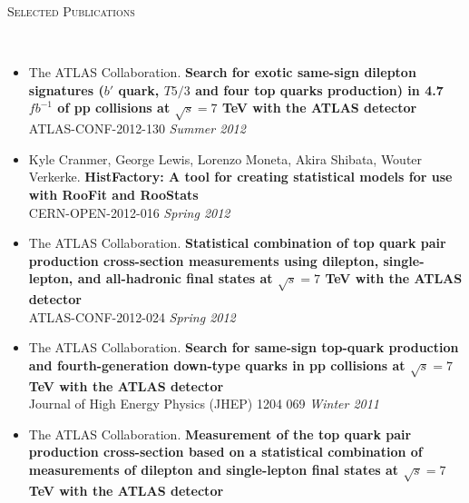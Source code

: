 \documentclass[9pt]{article}
\newenvironment{changemargin}[2]{%
  \begin{list}{}{%
    \setlength{\topsep}{0pt}%
    \setlength{\leftmargin}{#1}%
    \setlength{\rightmargin}{#2}%
    \setlength{\listparindent}{\parindent}%
    \setlength{\itemindent}{\parindent}%
    \setlength{\parsep}{\parskip}%
  }%
  \item[]}{\end{list}
}
\newcommand{\lineover}{
	\begin{changemargin}{-0.05in}{-0.05in}
		\vspace*{-8pt}
		\hrulefill \\
		\vspace*{-2pt}
	\end{changemargin}
}
\newcommand{\header}[1]{
	\begin{changemargin}{-0.5in}{-0.5in}
		\scshape{#1}\\
  	\lineover
	\end{changemargin}
}
\newenvironment{body} {
	\vspace*{-16pt}
	\begin{changemargin}{-0.25in}{-0.5in}
  }	
	{\end{changemargin}
}
\begin{document}
\smallskip


\clearpage
\newpage

\header{Selected Publications}

\begin{body}
  \vspace{14pt}
  \begin{itemize}
  \item The ATLAS Collaboration. \textbf{Search for exotic same-sign dilepton signatures ($b'$ quark, $T5/3$ and four top quarks production) in 4.7 $fb^{-1}$ of pp collisions at $\sqrt{s}=7$ TeV with the ATLAS detector} \\
    ATLAS-CONF-2012-130  \hfill \emph{Summer 2012} \\
    \medskip
  \item Kyle Cranmer, George Lewis, Lorenzo Moneta, Akira Shibata, Wouter Verkerke. \textbf{HistFactory: A tool for creating statistical models for use with RooFit and RooStats} \\
    CERN-OPEN-2012-016 \hfill \emph{Spring 2012} \\
    \medskip
  \item The ATLAS Collaboration.  \textbf{Statistical combination of top quark pair production cross-section measurements using dilepton, single-lepton, and all-hadronic final states at $\sqrt{s}=7$ TeV with the ATLAS detector} \\
    ATLAS-CONF-2012-024 \hfill \emph{Spring 2012} \\
    \medskip
  \item The ATLAS Collaboration. \textbf{Search for same-sign top-quark production and fourth-generation down-type quarks in pp collisions at $\sqrt{s}=7$ TeV with the ATLAS detector} \\ 
    Journal of High Energy Physics (JHEP) 1204 069 \hfill \emph{Winter 2011} \\
    \medskip
  \item The ATLAS Collaboration.  \textbf{Measurement of the top quark pair production cross-section based on a statistical combination of measurements of dilepton and single-lepton final states at $\sqrt{s}=7$ TeV with the ATLAS detector} \\

\end{itemize}
\end{body}
\end{document}
